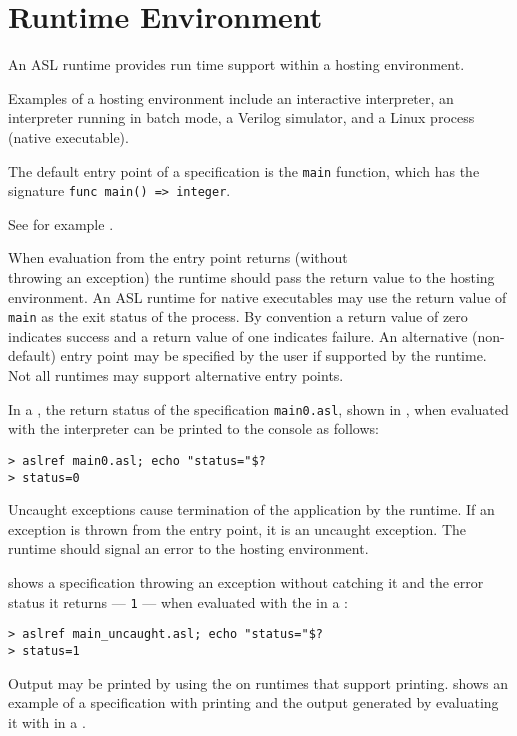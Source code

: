 \chapter{Runtime Environment\label{chap:RuntimeEnvironment}}

An ASL runtime provides run time support within a hosting environment.

Examples of a hosting environment include an interactive interpreter,
an interpreter running in batch mode,
a Verilog simulator, and a Linux process (native executable).

The default entry point of a specification is the \texttt{main} function, which has the signature
\verb|func main() => integer|.

See for example .

When evaluation from the entry point returns (without \\
throwing an exception)
the runtime should pass the return value to the hosting environment.
%
An ASL runtime for native executables may use the return value
of \texttt{main} as the exit status of the process.
%
By convention a return value of zero indicates success and a return value of
one indicates failure.
%
An alternative (non-default) entry point may be specified by the user if
supported by the runtime. Not all runtimes may support alternative entry points.

In a \linuxbashshell{}, the return status of the specification \texttt{main0.asl},
shown in ,
when evaluated with the \aslref{}
interpreter can be printed to the console as follows:
\begin{Verbatim}[frame=single]
> aslref main0.asl; echo "status="$?
> status=0
\end{Verbatim}


Uncaught exceptions cause termination of the application by the runtime.
If an exception is thrown from the entry point, it is an uncaught exception.
The runtime should signal an error to the hosting environment.

 shows a specification throwing an exception
without catching it and the error status it returns --- \texttt{1} ---
when evaluated with the \aslref{} in a \linuxbashshell{}:
\begin{verbatim}
> aslref main_uncaught.asl; echo "status="$?
> status=1
\end{verbatim}


Output may be printed by using the \printstatementterm{} on
runtimes that support printing.
%
 shows an example of a specification
with printing and the output generated by evaluating it with \aslref{}
in a \linuxbashshell{}.
